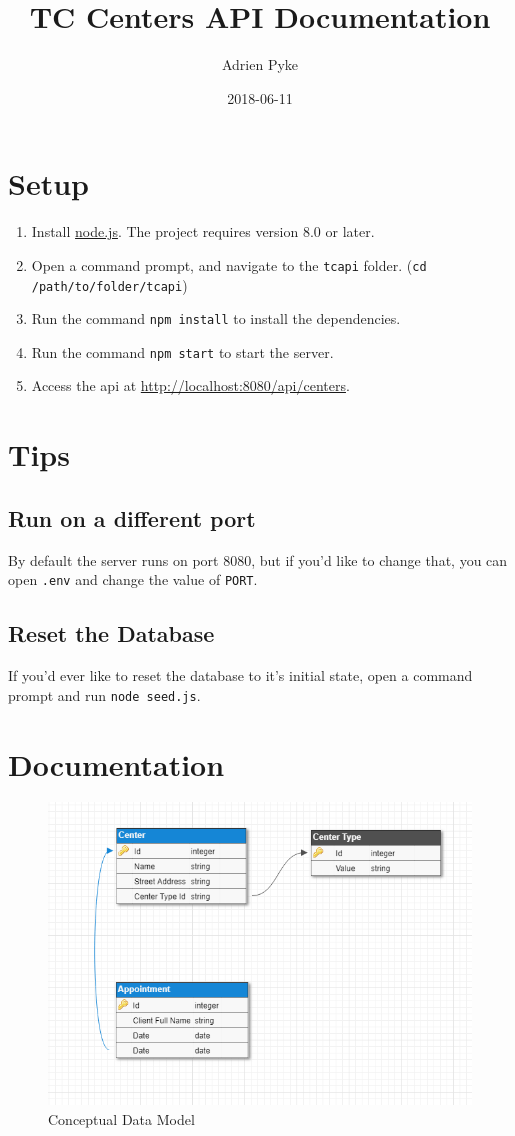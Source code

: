 \documentclass{article}
\title{TC Centers API Documentation}
\date{2018-06-11}
\author{Adrien Pyke}
\begin{document}
	\maketitle
	\newpage

	\section{Setup}
	\begin{enumerate}
		\item Install \href{https://nodejs.org/en/}{node.js}. The project requires version 8.0 or later.
		\item Open a command prompt, and navigate to the \texttt{tcapi} folder. (\texttt{cd /path/to/folder/tcapi})
		\item Run the command \texttt{npm install} to install the dependencies.
		\item Run the command \texttt{npm start} to start the server.
		\item Access the api at \url{http://localhost:8080/api/centers}.
	\end{enumerate}

	\section{Tips}

	\subsection{Run on a different port}
	By default the server runs on port 8080, but if you'd like to change that, you can open \texttt{.env} and change the value of \texttt{PORT}.

	\subsection{Reset the Database}
	If you'd ever like to reset the database to it's initial state, open a command prompt and run \texttt{node seed.js}.

	\newpage

	\section{Documentation}
	\begin{figure}[h!]
		\includegraphics[width=\linewidth]{data-model.png}
		\caption{Conceptual Data Model}
		\label{fig:datamodel}
	\end{figure}
\end{document}
